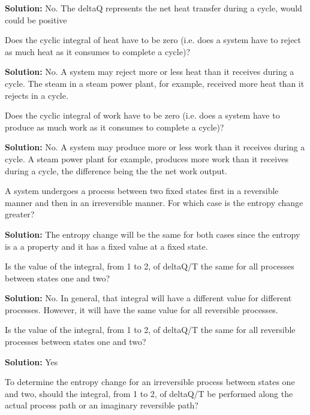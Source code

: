 \begin{list}{\bf Question :~}{}
       {\bf Solution:} No. The deltaQ represents the net heat transfer during a cycle, would could be positive

%
     \item\label{Q29} Does the cyclic integral of heat have to be zero (i.e. does a system have to reject as much heat as it consumes to complete a cycle)? 
%

       {\bf Solution:} No. A system may reject more or less heat than it receives during a cycle. The steam in a steam power plant, for example, received more heat than it rejects in a cycle.

%
     \item\label{Q30} Does the cyclic integral of work have to be zero (i.e. does a system have to produce as much work as it consumes to complete a cycle)? 
%

       {\bf Solution:} No. A system may produce more or less work than it receives during a cycle. A steam power plant for example, produces more work than it receives during a cycle, the difference being the the net work output.

%
     \item\label{Q31} A system undergoes a process between two fixed states first in a reversible manner and then in an irreversible manner. For which case is the entropy change greater?
%

       {\bf Solution:} The entropy change will be the same for both cases since the entropy is a a property and it has a fixed value at a fixed state.

%
     \item\label{Q32} Is the value of the integral, from 1 to 2, of deltaQ/T the same for all processes between states one and two?
%

       {\bf Solution:} No. In general, that integral will have a different value for different processes. However, it will have the same value for all reversible processes.

%
     \item\label{Q33} Is the value of the integral, from 1 to 2, of deltaQ/T the same for all reversible processes between states one and two?
%

       {\bf Solution:} Yes

%
     \item\label{Q34} To determine the entropy change for an irreversible process between states one and two, should the integral, from 1 to 2, of deltaQ/T be performed along the actual process path or an imaginary reversible path?
%


\end{list}
